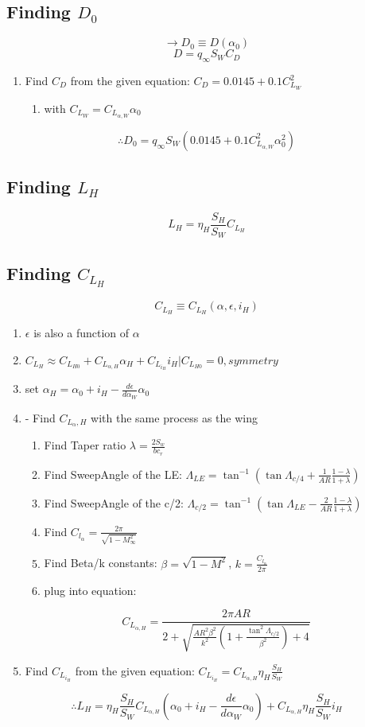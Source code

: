 \documentclass[a4paper, twoside]{article}
\begin{document}
\subsection{Finding \(D_0\)}
\[\rightarrow D_0 \equiv D(\alpha_0)\]
\[ D = q_\infty S_W C_D\]
\begin{enumerate}
\item Find $C_D$ from the given equation: $ C_D = 0.0145 + 0.1 C_{L_W}^2$
  \begin{enumerate}
  \item with $C_{L_W} = C_{L_{\alpha,W}}\alpha_0$
  \end{enumerate}
\end{enumerate}
\[\therefore D_0 = q_\infty S_W (0.0145 + 0.1C_{L_{\alpha,W}}^2 \alpha_0^2)\]

\subsection{Finding \(L_H\)}
\[ L_H = \eta_H \frac{S_H}{S_W} C_{L_H}\]
\subsection*{Finding \(C_{L_H}\)}
\[ C_{L_H} \equiv C_{L_H}(\alpha,\epsilon,i_H)\]
\begin{enumerate}
  
\item $\epsilon$ is also a function of $\alpha$
\item $C_{L_H} \approx C_{L_{H0}} + C_{L_{\alpha,H}}\alpha_H + C_{L_{i_H}} i_H | C_{L_{H0}} = 0,{symmetry}$
\item set $\alpha_H = \alpha_0 + i_H - \frac{d\epsilon}{d\alpha_W}\alpha_0$
\item- Find $C_{L_\alpha,H}$ with the same process as the wing
  \begin{enumerate}
  \item Find Taper ratio $\lambda = \frac{2S_w}{bc_r}$
  \item Find SweepAngle of the LE: $\Lambda_{LE} = \tan^{-1}\left(\tan{\Lambda_{c/4}} + \frac{1}{AR}\frac{1-\lambda}{1+\lambda}\right)$
  \item Find SweepAngle of the c/2: $\Lambda_{c/2} = \tan^{-1}\left(\tan{\Lambda_{LE}} - \frac{2}{AR}\frac{1-\lambda}{1+\lambda}\right)$
  \item Find $C_{l_\alpha} = \frac{2\pi}{\sqrt{1-M_\infty^2}}$
  \item Find Beta/k constants: $\beta = \sqrt{1-M^2}$, $k = \frac{C_{l_\alpha}}{2\pi}$
  \item plug into equation:
  \end{enumerate}
  \[C_{L_{\alpha,H}} = \frac{2\pi AR}{2+\sqrt{\frac{AR^2\beta^2}{k^2}\left(1+\frac{\tan^2{\Lambda_{c/2}}}{\beta^2}\right)+4}} \]
\item Find $C_{L_{i_H}}$ from the given equation: $C_{L_{i_H}} = C_{L_{\alpha,H}}\eta_H\frac{S_H}{S_W}$
\end{enumerate}
\[ \therefore L_H = \eta_H \frac{S_H}{S_W} C_{L_{\alpha,H}}\left(\alpha_0 + i_H - \frac{d\epsilon}{d\alpha_W}\alpha_0\right) + C_{L_{\alpha,H}}\eta_H\frac{S_H}{S_W} i_H \]
\end{document}
